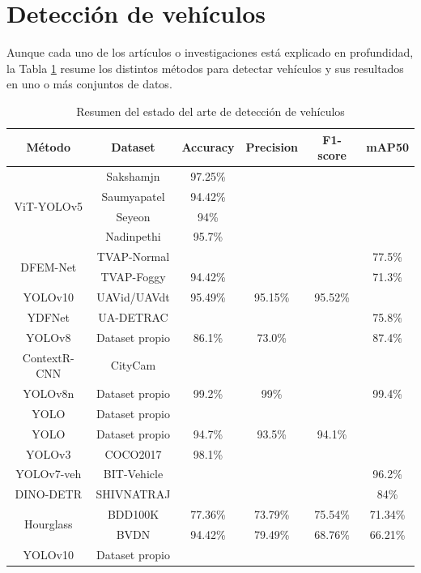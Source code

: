 \documentclass[12pt,a4paper,onecolumn,oneside]{report}
\begin{document}
\section{Detección de vehículos}

Aunque cada uno de los artículos o investigaciones está explicado en profundidad, la Tabla \ref{tab:resumen-arte-v} resume los distintos métodos para detectar vehículos y sus resultados en uno o más conjuntos de datos.

\begin{table}[ht]
    \centering
    \begin{tabular}{|c|c|c|c|c|c|}
    \hline
        \textbf{Método} & \textbf{Dataset} & \textbf{Accuracy} & \textbf{Precision} & \textbf{F1-score} & \textbf{mAP50}\\
        \hline
        \multirow{4}{*}{ViT-YOLOv5} & Sakshamjn & 97.25\% & \- & \- & \-\\
        & Saumyapatel & 94.42\% & \- & \- & \-\\
        & Seyeon & 94\% & \- & \- & \-\\
        & Nadinpethi & 95.7\% & \- & \- & \-\\
        \hline
        \multirow{2}{*}{DFEM-Net} & TVAP-Normal & \- & \- & \- & 77.5\%\\
        & TVAP-Foggy & 94.42\% & \- & \- & 71.3\%\\
        \hline
        YOLOv10 & UAVid/UAVdt & 95.49\% & 95.15\% & 95.52\% & \-\\
        \hline
        YDFNet & UA-DETRAC & \- & \- & \- & 75.8\%\\
        \hline
        YOLOv8 & Dataset propio & 86.1\% & 73.0\% & \- & 87.4\%\\
        \hline
        ContextR-CNN & CityCam & \- & \- & \- & \-\\
        \hline
        YOLOv8n & Dataset propio & 99.2\% & 99\% & \- & 99.4\%\\
        \hline
        YOLO & Dataset propio & \- & \- & \- & \-\\
        \hline
        YOLO & Dataset propio & 94.7\% & 93.5\% & 94.1\% & \-\\
        \hline
        YOLOv3 & COCO2017 & 98.1\% & \- & \- & \-\\
        \hline
        YOLOv7-veh & BIT-Vehicle & \- & \- & \- & 96.2\%\\
        \hline
        DINO-DETR & SHIVNATRAJ & \- & \- & \- & 84\%\\
        \hline
        \multirow{2}{*}{Hourglass} & BDD100K & 77.36\% & 73.79\% & 75.54\% & 71.34\%\\
        & BVDN & 94.42\% & 79.49\% & 68.76\% & 66.21\%\\
        \hline
        YOLOv10 & Dataset propio & \- & \- & \- & \-\\
        \hline
    \end{tabular}
    \caption{Resumen del estado del arte de detección de vehículos}
    \label{tab:resumen-arte-v}
\end{table}
\end{document}
